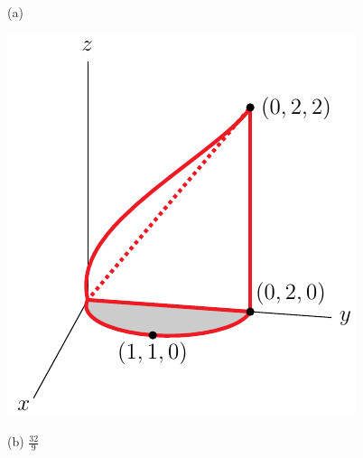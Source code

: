 %

\begin{answer}
(a)
\begin{center}
     \includegraphics[scale=0.8]{fig/OE05D_8.pdf}
\end{center}

(b) $\frac{32}{9}$
\end{answer}

